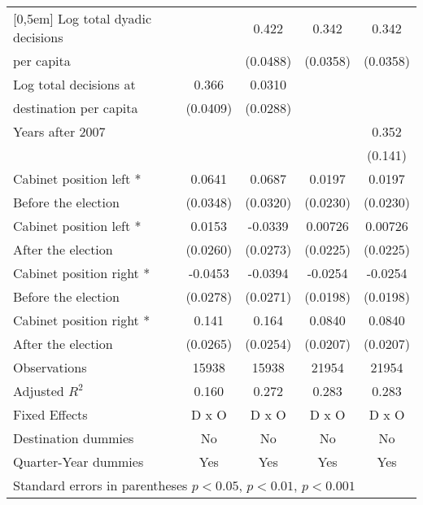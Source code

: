 \begin{table}[htbp]
\begin{tabular}{l*{4}{c}}
[0,5em]
Log total dyadic decisions&                     &       0.422\sym{***}&       0.342\sym{***}&       0.342\sym{***}\\
per capita                    &                     &    (0.0488)         &    (0.0358)         &    (0.0358)         \\
[0,5em]
Log total decisions at &       0.366\sym{***}&      0.0310         &                     &                     \\
destination per capita                    &    (0.0409)         &    (0.0288)         &                     &                     \\
[0,5em]
Years after 2007    &                     &                     &                     &       0.352\sym{*}  \\
                    &                     &                     &                     &     (0.141)         \\
[0,5em]
Cabinet position left *&      0.0641         &      0.0687\sym{*}  &      0.0197         &      0.0197         \\
 Before the election                    &    (0.0348)         &    (0.0320)         &    (0.0230)         &    (0.0230)         \\
[0,5em]
Cabinet position left * &      0.0153         &     -0.0339         &     0.00726         &     0.00726         \\
After the election                    &    (0.0260)         &    (0.0273)         &    (0.0225)         &    (0.0225)         \\
[0,5em]
Cabinet position right *&     -0.0453         &     -0.0394         &     -0.0254         &     -0.0254         \\
 Before the election                    &    (0.0278)         &    (0.0271)         &    (0.0198)         &    (0.0198)         \\
[0,5em]
Cabinet position right *&       0.141\sym{***}&       0.164\sym{***}&      0.0840\sym{***}&      0.0840\sym{***}\\
 After the election                    &    (0.0265)         &    (0.0254)         &    (0.0207)         &    (0.0207)         \\
\hline
Observations        &       15938         &       15938         &       21954         &       21954         \\
Adjusted \(R^{2}\)  &       0.160         &       0.272         &       0.283         &       0.283         \\
Fixed Effects       &       D x O         &       D x O         &       D x O         &       D x O         \\
Destination dummies &          No         &          No         &          No         &          No         \\
Quarter-Year dummies&         Yes         &         Yes         &         Yes         &         Yes         \\
\hline\hline
\multicolumn{5}{l}{Standard errors in parentheses \sym{*} \(p<0.05\), \sym{**} \(p<0.01\), \sym{***} \(p<0.001\)}\\
\end{tabular}
\end{table}
